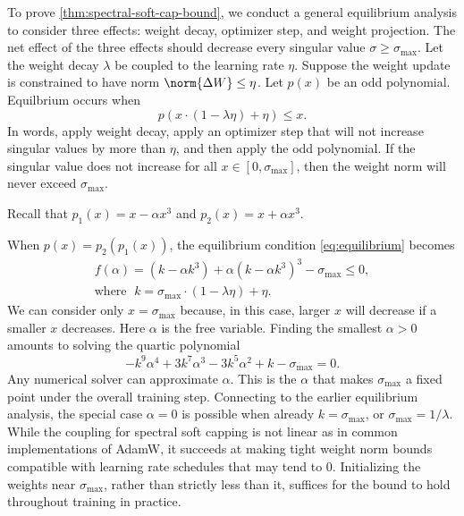 To prove \cref{thm:spectral-soft-cap-bound}, we conduct a general equilibrium analysis to consider three effects: weight decay, optimizer step, and weight projection. The net effect of the three effects should decrease every singular value $\sigma \geq \sigma_\text{max}$. Let the weight decay $\lambda$ be coupled to the learning rate $\eta$. Suppose the weight update is constrained to have norm $\norm{\Delta W} \leq \eta$. Let $p(x)$ be an odd polynomial. Equilbrium occurs when \begin{equation}
    \label{eq:equilibrium}
    p(x \cdot (1 - \lambda \eta) + \eta) \leq x.
\end{equation} In words, apply weight decay, apply an optimizer step that will not increase singular values by more than $\eta$, and then apply the odd polynomial. If the singular value does not increase for all $x \in [0, \sigma_\text{max}]$, then the weight norm will never exceed $\sigma_\text{max}$.

Recall that $p_1(x) = x - \alpha x^3$ and $p_2(x) = x + \alpha x^3$.

When $p(x) = p_2(p_1(x))$, the equilibrium condition \cref{eq:equilibrium} becomes \begin{gather}
    f(\alpha) = \left(k-\alpha k^{3}\right)+\alpha\left(k-\alpha k^{3}\right)^{3} - \sigma_\text{max} \leq 0, \\
    \text{where } \; k = \sigma_\text{max} \cdot (1 - \lambda \eta) + \eta.
\end{gather} We can consider only $x = \sigma_\text{max}$ because, in this case, larger $x$ will decrease if a smaller $x$ decreases. Here $\alpha$ is the free variable. Finding the smallest $\alpha > 0$ amounts to solving the quartic polynomial \begin{equation}
    \label{eq:generalized-coupling}
    -k^9 \alpha^4 + 3k^7 \alpha^3 - 3k^5 \alpha^2 + k - \sigma_\text{max} = 0.
\end{equation} Any numerical solver can approximate $\alpha$. This is the $\alpha$ that makes $\sigma_\text{max}$ a fixed point under the overall training step. Connecting to the earlier equilibrium analysis, the special case $\alpha = 0$ is possible when already $k = \sigma_\text{max}$, or $\sigma_\text{max} = 1/\lambda$. While the coupling for spectral soft capping is not linear as in common implementations of AdamW, it succeeds at making tight weight norm bounds compatible with learning rate schedules that may tend to $0$. Initializing the weights near $\sigma_\text{max}$, rather than strictly less than it, suffices for the bound to hold throughout training in practice.

